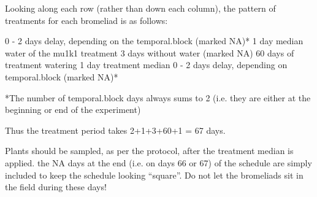 \message{ !name(how.to.use.schedule.tex)}\documentclass[12pt]{article}
\begin{document}
Looking along each row (rather than down each column), the pattern of treatments for each bromeliad is as follows:

0 - 2 days delay, depending on the temporal.block (marked NA)*
1 day median water of the mu1k1 treatment
3 days without water (marked NA)
60 days of treatment watering
1 day treatment median
0 - 2 days delay, depending on temporal.block (marked NA)*

*The number of temporal.block days always sums to 2 (i.e. they are either at the beginning or end of the experiment)

Thus the treatment period takes 2+1+3+60+1 = 67 days.

Plants should be sampled, as per the protocol, after the treatment median is applied.  the NA days at the end (i.e. on days 66 or 67) of the schedule are simply included to keep the schedule looking ``square''.  Do not let the bromeliads sit in the field during these days!
\end{document}
